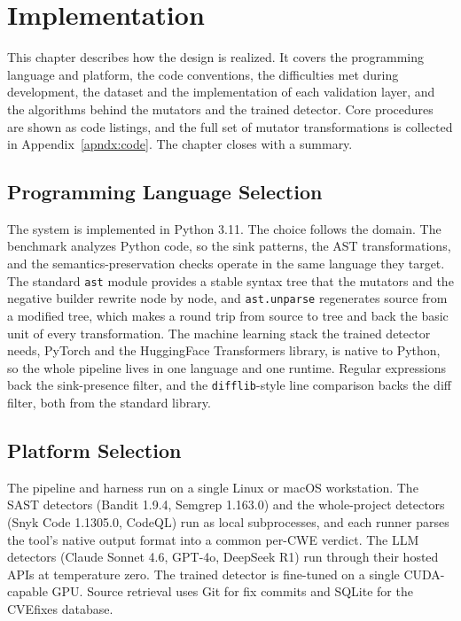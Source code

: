 \chapter{Implementation}
\label{ch:impl}

This chapter describes how the design is realized. It covers the programming
language and platform, the code conventions, the difficulties met during
development, the dataset and the implementation of each validation layer, and
the algorithms behind the mutators and the trained detector. Core procedures are
shown as code listings, and the full set of mutator transformations is collected
in Appendix~\ref{apndx:code}. The chapter closes with a summary.


\section{Programming Language Selection}

The system is implemented in Python 3.11. The choice follows the domain. The
benchmark analyzes Python code, so the sink patterns, the AST transformations,
and the semantics-preservation checks operate in the same language they target.
The standard \texttt{ast} module provides a stable syntax tree that the mutators
and the negative builder rewrite node by node, and \texttt{ast.unparse}
regenerates source from a modified tree, which makes a round trip from source to
tree and back the basic unit of every transformation. The machine learning stack
the trained detector needs, PyTorch and the HuggingFace Transformers library, is
native to Python, so the whole pipeline lives in one language and one runtime.
Regular expressions back the sink-presence filter, and the \texttt{difflib}-style
line comparison backs the diff filter, both from the standard library.

\section{Platform Selection}

The pipeline and harness run on a single Linux or macOS workstation. The SAST
detectors (Bandit 1.9.4, Semgrep 1.163.0) and the whole-project detectors (Snyk
Code 1.1305.0, CodeQL) run as local subprocesses, and each runner parses the
tool's native output format into a common per-CWE verdict. The LLM detectors
(Claude Sonnet 4.6, GPT-4o, DeepSeek R1) run through their hosted APIs at
temperature zero. The trained detector is fine-tuned on a single CUDA-capable
GPU. Source retrieval uses Git for fix commits and SQLite for the CVEfixes
database.

